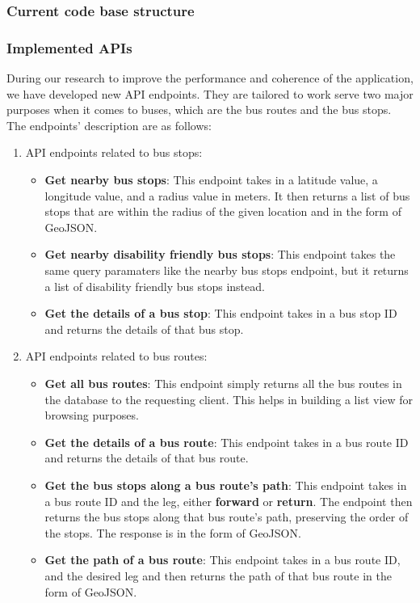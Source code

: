 \subsubsection{Current code base structure}

\subsubsection{Implemented APIs}

During our research to improve the performance and coherence of the application, we have developed new API endpoints. They are tailored to work serve two major purposes when it comes to buses, which are the bus routes and the bus stops. The endpoints' description are as follows:
\begin{enumerate}
    \item API endpoints related to bus stops:
    \begin{itemize}
        \item \textbf{Get nearby bus stops}: This endpoint takes in a latitude value, a longitude value, and a radius value in meters. It then returns a list of bus stops that are within the radius of the given location and in the form of GeoJSON.
        \item \textbf{Get nearby disability friendly bus stops}: This endpoint takes the same query paramaters like the nearby bus stops endpoint, but it returns a list of disability friendly bus stops instead.
        \item \textbf{Get the details of a bus stop}: This endpoint takes in a bus stop ID and returns the details of that bus stop.
    \end{itemize}
    \item API endpoints related to bus routes:
    \begin{itemize}
        \item \textbf{Get all bus routes}: This endpoint simply returns all the bus routes in the database to the requesting client. This helps in building a list view for browsing purposes.
        \item \textbf{Get the details of a bus route}: This endpoint takes in a bus route ID and returns the details of that bus route.
        \item \textbf{Get the bus stops along a bus route's path}: This endpoint takes in a bus route ID and the leg, either \textbf{forward} or \textbf{return}. The endpoint then returns the bus stops along that bus route's path, preserving the order of the stops. The response is in the form of GeoJSON.
        \item \textbf{Get the path of a bus route}: This endpoint takes in a bus route ID, and the desired leg and then returns the path of that bus route in the form of GeoJSON.
    \end{itemize}
\end{enumerate}

